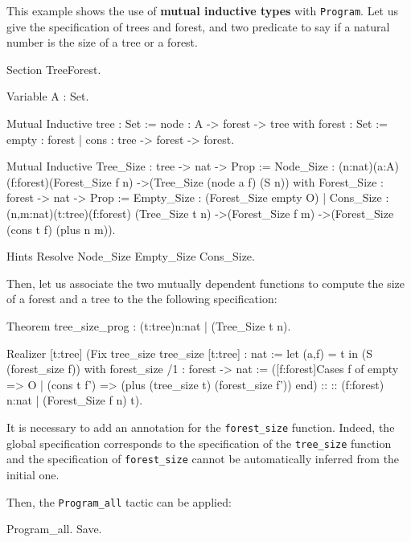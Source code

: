 \label{program-ex-mutual}
This example shows the use of {\bf mutual inductive types} with
\verb=Program=. Let us give the specification of trees and forest, and
two predicate to say if a natural number is the size of a tree or a
forest. 

\begin{coq_example*}
Section TreeForest.

Variable A : Set.

Mutual Inductive 
     tree   : Set := node : A -> forest -> tree
with forest : Set := empty : forest 
                  | cons : tree -> forest -> forest.

Mutual Inductive Tree_Size : tree -> nat -> Prop :=
  Node_Size : (n:nat)(a:A)(f:forest)(Forest_Size f n)
               ->(Tree_Size (node a f) (S n))
with Forest_Size : forest -> nat -> Prop :=
  Empty_Size : (Forest_Size empty O)
| Cons_Size : (n,m:nat)(t:tree)(f:forest)
    (Tree_Size t n)
    ->(Forest_Size f m)
    ->(Forest_Size (cons t f) (plus n m)).

Hints Resolve Node_Size Empty_Size Cons_Size.
\end{coq_example*}

Then, let us associate the two mutually dependent functions to compute
the size of a forest and a tree to the the following specification:

\begin{coq_example*}
Theorem tree_size_prog : (t:tree){n:nat | (Tree_Size t n)}.

Realizer [t:tree]
(Fix tree_size{
  tree_size [t:tree] : nat := let (a,f) = t in (S (forest_size f))
  with forest_size /1 : forest -> nat 
    := ([f:forest]Cases f of
         empty => O
       | (cons t f') => (plus (tree_size t) (forest_size f'))
       end)
       :: :: {(f:forest) {n:nat | (Forest_Size f n)}}}
                   t).
\end{coq_example*}

It is necessary to add an annotation for the \verb=forest_size=
function. Indeed, the global specification corresponds to the
specification of the \verb=tree_size= function and the specification
of \verb=forest_size= cannot be automatically inferred from the
initial one.

Then, the \verb=Program_all= tactic can be applied:
\begin{coq_example}
Program_all.
Save.
\end{coq_example}


